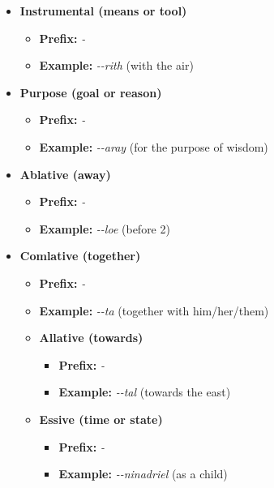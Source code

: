 \documentclass[letterpaper,twocolumn,openany,nodeprecatedcode,hidelinks]{dndbook}
\begin{document}
{\begin{itemize}
\begin{itemize}
        \item \textbf{Prefix:} \textit{\CAtem-}
        \item \textbf{Example:} \textit{\CAtem-\CLab-loe} (at two o'clock)
    \end{itemize}
    \item \textbf{Instrumental (means or tool)}
    \begin{itemize}
        \item \textbf{Prefix:} \textit{\CAins-}
        \item \textbf{Example:} \textit{\CAins-\CLin-rith} (with the air)
    \end{itemize}
        \item \textbf{Purpose (goal or reason)}
    \begin{itemize}
        \item \textbf{Prefix:} \textit{\CApur-}
        \item \textbf{Example:} \textit{\CApur-\CLab-aray} (for the purpose of wisdom)
    \end{itemize}

    \item \textbf{Ablative (away)}
    \begin{itemize}
        \item \textbf{Prefix:} \textit{\CAabl-}
        \item \textbf{Example:} \textit{\CAabl-\CLab-loe} (before 2)
    \end{itemize}

     \item \textbf{Comlative (together)}
    \begin{itemize}
        \item \textbf{Prefix:} \textit{\CAcom-}
        \item \textbf{Example:} \textit{\CAcom-\CLan-ta} (together with him/her/them)

             \item \textbf{Allative (towards)}
    \begin{itemize}
        \item \textbf{Prefix:} \textit{\CAall-}
        \item \textbf{Example:} \textit{\CAall-\CLan-tal} (towards the east)
    \end{itemize}


     \item \textbf{Essive (time or state)}
    \begin{itemize}
        \item \textbf{Prefix:} \textit{\CAess-}
        \item \textbf{Example:} \textit{\CAess-\CLan-ninadriel} (as a child)
    \end{itemize}



\end{itemize}
\end{itemize}}
\end{document}
